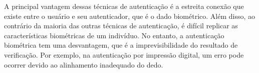 A principal vantagem dessas técnicas de autenticação é a estreita conexão que
existe entre o usuário e seu autenticador, que é o dado biométrico.
Além disso, ao contrário da maioria das outras técnicas de autenticação,
é difícil replicar as características biométricas de um indivíduo.
No entanto, a autenticação biométrica tem uma desvantagem, que é a imprevisibilidade
do resultado de verificação.
Por exemplo, na autenticação por impressão digital, um erro pode ocorrer devido
ao alinhamento inadequado do dedo\cite{idrus2013}.